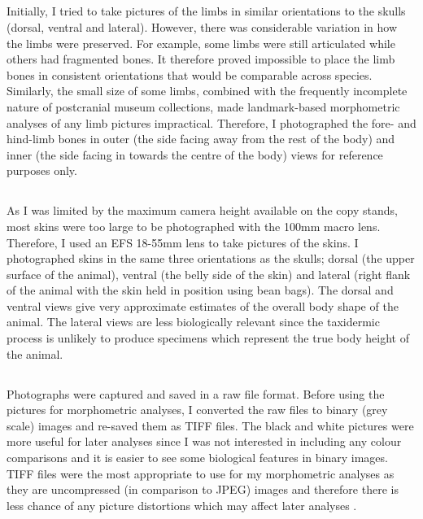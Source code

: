 
\subsection{}
Initially, I tried to take pictures of the limbs in similar orientations to the skulls (dorsal, ventral and lateral). However, there was considerable variation in how the limbs were preserved. For example, some limbs were still articulated while others had fragmented bones. It therefore proved impossible to place the limb bones in consistent orientations that would be comparable across species. Similarly, the small size of some limbs, combined with the frequently incomplete nature of postcranial museum collections, made landmark-based morphometric analyses of any limb pictures impractical. Therefore, I photographed the fore- and hind-limb bones in outer (the side facing away from the rest of the body) and inner (the side facing in towards the centre of the body) views for reference purposes only.

\subsection{}
As I was limited by the maximum camera height available on the copy stands, most skins were too large to be photographed with the 100mm macro lens. Therefore, I used an EFS 18-55mm lens to take pictures of the skins. I photographed skins in the same three orientations as the skulls; dorsal (the upper surface of the animal), ventral (the belly side of the skin) and lateral (right flank of the animal with the skin held in position using bean bags). The dorsal and ventral views give very approximate estimates of the overall body shape of the animal. The lateral views are less biologically relevant since the taxidermic process is unlikely to produce specimens which represent the true body height of the animal.

\subsection{}
Photographs were captured and saved in a raw file format. Before using the pictures for morphometric analyses, I converted the raw files to binary (grey scale) images and re-saved them as TIFF files. The black and white pictures were more useful for later analyses since I was not interested in including any colour comparisons and it is easier to see some biological features in binary images. TIFF files were the most appropriate to use for my morphometric analyses as they are uncompressed (in comparison to JPEG) images and therefore there is less chance of any picture distortions which may affect later analyses \citep{HERC2013}.

